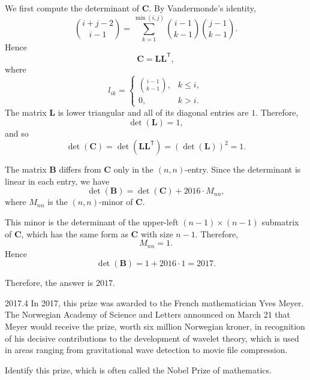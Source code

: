     \begin{solution}
        We first compute the determinant of $\mathbf{C}$. By Vandermonde's identity,
        \[
            \binom{i+j-2}{i-1}
            =
            \sum_{k=1}^{\min(i,j)}
            \binom{i-1}{k-1}
            \binom{j-1}{k-1}.
        \]
        Hence
        \[
            \mathbf{C}=\mathbf{L}\mathbf{L}^{\mathsf T},
        \]
        where
        \[
            l_{ik}
            =
            \begin{cases}
                \binom{i-1}{k-1}, & k\leq i, \\
                0, & k>i.
            \end{cases}
        \]
        The matrix $\mathbf{L}$ is lower triangular and all of its diagonal entries are $1$.
        Therefore,
        \[
            \det(\mathbf{L})=1,
        \]
        and so
        \[
            \det(\mathbf{C})
            =
            \det(\mathbf{L}\mathbf{L}^{\mathsf T})
            =
            (\det(\mathbf{L}))^2
            =
            1.
        \]

        The matrix $\mathbf{B}$ differs from $\mathbf{C}$ only in the $(n,n)$-entry. Since the
        determinant is linear in each entry, we have
        \[
            \det(\mathbf{B})
            =
            \det(\mathbf{C})
            +
            2016\cdot M_{nn},
        \]
        where $M_{nn}$ is the $(n,n)$-minor of $\mathbf{C}$.

        This minor is the determinant of the upper-left $(n-1)\times(n-1)$ submatrix of
        $\mathbf{C}$, which has the same form as $\mathbf{C}$ with size $n-1$. Therefore,
        \[
            M_{nn}=1.
        \]
        Hence
        \[
            \det(\mathbf{B})
            =
            1+2016\cdot 1
            =
            2017.
        \]

        Therefore, the answer is $\boxed{2017}$.
    \end{solution}

    \begin{pastproblem}{2017.4}
        In 2017, this prize was awarded to the French mathematician Yves Meyer. The Norwegian
        Academy of Science and Letters announced on March 21 that Meyer would receive the prize,
        worth six million Norwegian kroner, in recognition of his decisive contributions to the
        development of wavelet theory, which is used in areas ranging from gravitational wave
        detection to movie file compression.

        Identify this prize, which is often called the Nobel Prize of mathematics.
    \end{pastproblem}

